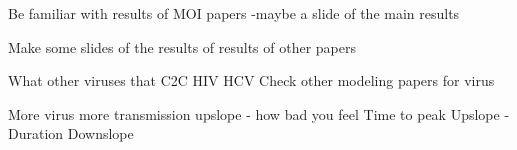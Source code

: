 \documentclass{beamer}
\begin{document}
\begin{frame}{}
    \begin{center}
        Be familiar with results of MOI papers
        -maybe a slide of the main results
    \end{center}
\end{frame}

\begin{frame}{}
    \begin{center}
    \end{center}
\end{frame}

\begin{frame}{}
    \begin{center}
    \end{center}
\end{frame}

\begin{frame}{}
    \begin{center}
        Make some slides of the results of results of other papers
    \end{center}
\end{frame}

\begin{frame}{}
    \begin{center}
        What other viruses that C2C
        HIV
        HCV
        Check other modeling papers for virus
    \end{center}
\end{frame}

\begin{frame}{}
    \begin{center}
        More virus more transmission
        upslope - how bad you feel
        Time to peak
        Upslope         -   Duration
        Downslope
    \end{center}
\end{frame}
\end{document}
